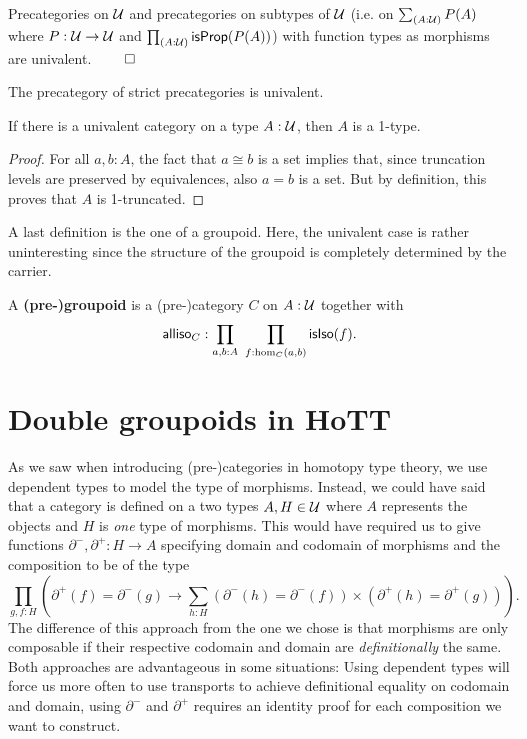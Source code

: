 \begin{lemma}
Precategories on $\mathcal{U}$ and 	precategories on subtypes of $\mathcal{U}$ (i.e. on
$\sum_{(A : \mathcal{U})} P(A)$ where $P : \mathcal{U} \to \mathcal{U}$ and $\prod_{(A : \mathcal{U})} \mathsf{isProp}(P(A))$)
with function types as morphisms are univalent. \hfill $\qed$
\end{lemma}

\begin{lemma} \label{thm:precat-univalent}
The precategory of strict precategories is univalent.
\end{lemma}


\begin{lemma} \label{thm:cat-1-type}
If there is a univalent category on a type $A : \mathcal{U}$, then $A$ is a 1-type.
\end{lemma}

\begin{proof}
For all $a, b : A$, the fact that $a \cong b$ is a set implies that, since
truncation levels are preserved by equivalences, also $a = b$ is a set.
But by definition, this proves that $A$ is 1-truncated.
\end{proof}

A last definition is the one of a groupoid.
Here, the univalent case is rather uninteresting since the structure of the groupoid
is completely determined by the carrier. %

\begin{defn}
A \textbf{(pre-)groupoid} is a (pre-)category $C$ on $A : \mathcal{U}$ together with
\begin{equation*}
\mathsf{alliso}_C : \prod_{a,b:A} ~ \prod_{f:\hom_C(a,b)} \mathsf{isIso}(f) \text{.}
\end{equation*}
\end{defn}

\section{Double groupoids in HoTT}

As we saw when introducing (pre-)categories in homotopy type theory, we use
dependent types to model the type of morphisms. Instead, we could have said that
a category is defined on a two types $A, H \in \mathcal{U}$ where $A$ represents the objects
and $H$ is \emph{one} type of morphisms.
This would have required us to give functions $\partial^-, \partial^+ : H \to A$
specifying domain and codomain of morphisms and the composition to be of the type
\begin{equation*}
\prod_{g,f:H} \left(\partial^+(f) = \partial^-(g) \to 
	\sum_{h:H} \left(\partial^-(h)=\partial^-(f)\right)
		\times \left(\partial^+(h)=\partial^+(g) \right) \right) \text{.}
\end{equation*}
The difference of this approach from the one we chose is that morphisms are only
composable if their respective codomain and domain are \emph{definitionally}
the same. Both approaches are advantageous in some situations:
Using dependent types will force us more often to use transports to achieve
definitional equality on codomain and domain, using $\partial^-$ and $\partial^+$
requires an identity proof for each composition we want to construct.

